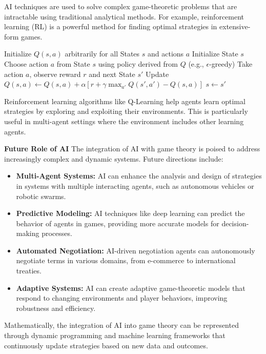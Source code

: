 \documentclass[12pt]{book} %
\begin{document}
AI techniques are used to solve complex game-theoretic problems that are intractable using traditional analytical methods. For example, reinforcement learning (RL) is a powerful method for finding optimal strategies in extensive-form games.
\FloatBarrier
\begin{algorithm}
\caption{Q-Learning for Optimal Strategy}
\begin{algorithmic}[1]
\State Initialize $Q(s, a)$ arbitrarily for all States $s$ and actions $a$
\State Initialize State $s$
    \State Choose action $a$ from State $s$ using policy derived from $Q$ (e.g., $\epsilon$-greedy)
    \State Take action $a$, observe reward $r$ and next State $s'$
    \State Update $Q(s, a) \leftarrow Q(s, a) + \alpha [r + \gamma \max_{a'} Q(s', a') - Q(s, a)]$
    \State $s \leftarrow s'$
\EndWhile
\end{algorithmic}
\end{algorithm}
\FloatBarrier

Reinforcement learning algorithms like Q-Learning help agents learn optimal strategies by exploring and exploiting their environments. This is particularly useful in multi-agent settings where the environment includes other learning agents.

\textbf{Future Role of AI}
The integration of AI with game theory is poised to address increasingly complex and dynamic systems. Future directions include:

\begin{itemize}
    \item \textbf{Multi-Agent Systems:} AI can enhance the analysis and design of strategies in systems with multiple interacting agents, such as autonomous vehicles or robotic swarms.
    \item \textbf{Predictive Modeling:} AI techniques like deep learning can predict the behavior of agents in games, providing more accurate models for decision-making processes.
    \item \textbf{Automated Negotiation:} AI-driven negotiation agents can autonomously negotiate terms in various domains, from e-commerce to international treaties.
    \item \textbf{Adaptive Systems:} AI can create adaptive game-theoretic models that respond to changing environments and player behaviors, improving robustness and efficiency.
\end{itemize}

Mathematically, the integration of AI into game theory can be represented through dynamic programming and machine learning frameworks that continuously update strategies based on new data and outcomes.
\end{document}
